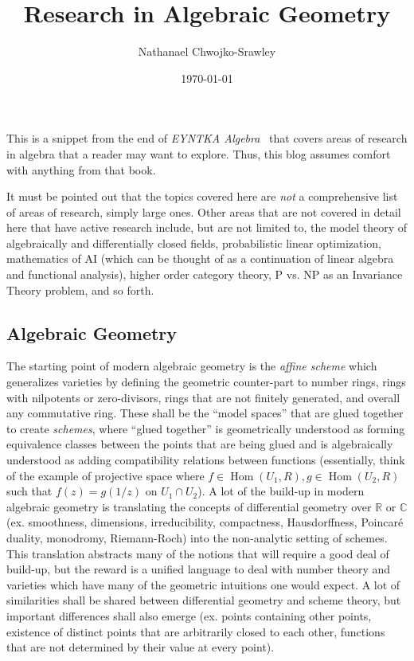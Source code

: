 \documentclass{article}
\title{Research in Algebraic Geometry}
\author{Nathanael Chwojko-Srawley}
\date{\today}
\renewcommand{\maketitle}{
    \quad
    \vspace{1em}
  \begin{center}
      \LARGE\bfseries \thetitle \par
      \vspace{0.6em}
      \large
  \end{center}
    \vspace{1em}
}
\newcommand{\C}{{\mathbb{C}}}
\newcommand{\R}{{\mathbb{R}}}
\newcommand{\Hom}{{\operatorname{Hom}}}
\begin{document}
\maketitle

This is a snippet from the end of \emph{EYNTKA Algebra}~\cite{NateAlgebra} that covers areas of research in algebra that a reader
may want to explore. Thus, this blog assumes comfort with anything from that book.


It must be pointed out that the topics covered here are \emph{not} a comprehensive list of areas of research,
simply large ones. Other areas that are not covered in detail here that have active research include, but are
not limited to, the model theory of algebraically and differentially closed fields, probabilistic linear
optimization, mathematics of AI (which can be thought of as a continuation of linear algebra and functional
analysis), higher order category theory, P vs. NP as an Invariance Theory problem, and so forth.

\subsection*{Algebraic Geometry}

The starting point of modern algebraic geometry is
the \emph{affine scheme} which generalizes varieties
by defining the geometric counter-part to number rings, rings with nilpotents or zero-divisors, rings that are
not finitely generated, and overall any commutative ring. These shall be the ``model spaces'' that are glued
together to create \emph{schemes}, where ``glued together'' is geometrically understood as forming equivalence
classes between the points that are being glued and is algebraically understood as adding compatibility
relations between functions (essentially, think of the example of projective space where $f \in \Hom(U_1,
R),g\in \Hom(U_2, R)$ such that $f(z) = g(1/z)$ on $U_1\cap U_2$). A lot of the build-up in modern algebraic
geometry is translating the concepts of differential geometry over $\R$ or $\C$ (ex. smoothness, dimensions,
irreducibility, compactness, Hausdorffness, Poincar\'e duality, monodromy, Riemann-Roch) into the non-analytic
setting of schemes. This translation abstracts many of the notions that will require a good deal of build-up,
but the reward is a unified language to deal with number theory and varieties which have many of the geometric
intuitions one would expect. A lot of similarities shall be shared between differential geometry and scheme
theory, but important differences shall also emerge (ex. points containing other points, existence of distinct
points that are arbitrarily closed to each other, functions that are not determined by their value at every
point).
\end{document}
